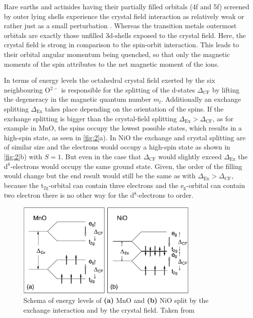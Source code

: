 Rare earths and actinides having their partially filled orbitals (4f and 5f) screened by outer lying shells experience the crystal field interaction as relatively weak or rather just as a small perturbation .
Whereas the transition metals outermost orbitals are exactly those unfilled 3d-shells exposed to the crystal field.
Here, the crystal field is strong in comparison to the spin-orbit interaction.
This leads to their orbital angular momentum being quenched, so that only the magnetic moments of the spin attributes to the net magnetic moment of the ions.

In terms of energy levels the octahedral crystal field exerted by the six neighbouring O$^{2-}$ is responsible for the splitting of the d-states $\Delta_{\text{CF}}$ by lifting the degeneracy in the magnetic quantum number $m_l$.
Additionally an exchange splitting $\Delta_{\text{Ex}}$ takes place depending on the orientation of the spins.
If the exchange splitting is bigger than the crystal-field splitting $\Delta_{\text{Ex}} > \Delta_{\text{CF}}$, as for example in MnO, the spins occupy the lowest possible states, which results in a high-spin state, as seen in \autoref{fig:2}a).
In NiO the exchange and crystal splitting are of similar size and the electrons would occupy a high-spin state as shown in \autoref{fig:2}b) with $S=1$. But even in the case that $\Delta_{\text{CF}}$ would slightly exceed $\Delta_{\text{Ex}}$ the d$^8$-electrons would occupy the same ground state.
Given, the order of the filling would change but the end result would still be the same as with $\Delta_{\text{Ex}} > \Delta_{\text{CF}}$, because the t$_{\text{2g}}$-orbital can contain three electrons and the e$_{\text{g}}$-orbital can contain two electron there is no other way for the d$^8$-electrons to order.
\begin{figure}[ht]
    \centering
    \includegraphics[width=0.8\textwidth]{pictures/2.png}
    \caption{Schema of energy levels of \textbf{(a)} MnO and \textbf{(b)} NiO split by the exchange interaction and by the crystal field. Taken from }
    \label{fig:2}
\end{figure}
